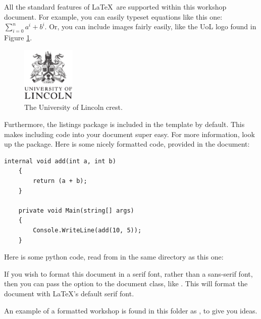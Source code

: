 \documentclass{lincolncslab}
\begin{document}
	\pagebreak
	
	
	All the standard features of \LaTeX \, are supported within this workshop document. For example, you can easily typeset equations like this one: $\sum_{i = 0}^n{a^i + b^i}$. Or, you can include images fairly easily, like the UoL logo found in Figure \ref{fig:logo}.
	
	\begin{figure}[h]
		\centering
		\includegraphics[width=1in]{logo}
		\caption{The University of Lincoln crest.}
		\label{fig:logo}
	\end{figure}
	
	Furthermore, the listings package is included in the template by default. This makes including code into your document super easy. For more information, look up the  package. Here is some nicely formatted code, provided in the document:
	
	\begin{lstlisting}[language={[Sharp]C}]
	internal void add(int a, int b)
	{
		return (a + b);
	}
	
	private void Main(string[] args)
	{
		Console.WriteLine(add(10, 5));
	}
	\end{lstlisting}
	
	Here is some python code, read from  in the same directory as this one:
	
	
	
	
	If you wish to format this document in a serif font, rather than a sans-serif font, then you can pass the  option to the document class, like . This will format the document with \LaTeX's default serif font.
	
	An example of a formatted workshop is found in this folder as , to give you ideas.
	
	
	
	
\end{document}
